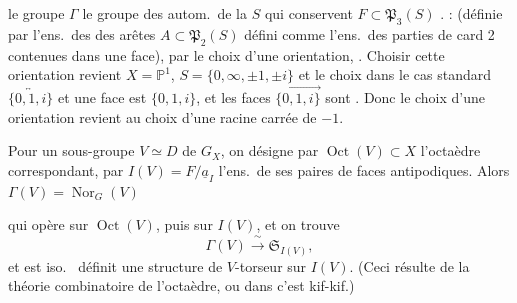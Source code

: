\documentclass[11pt,a4paper]{article}
\begin{document}
\ill{} le groupe $\Gamma$   le groupe des autom.\ de
la  \struck{\ill{}} $S$ qui conservent
\struck{\ill{}}  $F \subset \mathfrak{P}_{3}(S)$ \ill{}.
 : (définie par l'ens.\ des \ill{}
des arêtes $A \subset \mathfrak{P}_{2}(S)$  défini comme l'ens.\ des
parties de card 2 contenues dans une face), par le choix 
d'une orientation, \ill{}. Choisir cette orientation revient \ill{}
\ill{} $X = \mathbb{P}^{1}$, $S = \{0, \infty, \pm 1, \pm i\}$ et le choix
dans le cas standard \ill{}  $\overleftrightarrow{\{0,1,i\}}$
et \ill{} une face est $\{0, 1, i\}$, et les faces
$\overrightarrow{\{0,1,i\}}$ sont . Donc le choix d'une
orientation revient au choix d'une racine carrée de $-1$.

Pour un sous-groupe $V \simeq D$ de $G_{X}$, on désigne par
$\operatorname{Oct}(V) \subset X$ l'octaèdre correspondant, par
$I(V) = F/\underline{a}_{I}$ l'ens.\ de ses paires de faces antipodiques. Alors
$\Gamma(V) = \operatorname{Nor}_{G}(V)$

qui opère sur $\operatorname{Oct}(V)$, puis sur $I(V)$, et on trouve
\[
  \Gamma(V) \xrightarrow{\ \sim\ } \mathfrak{S}_{I(V)} ,
\]
et est iso.\ \struck{\ill{}} définit une structure de $V$-torseur sur $I(V)$.
(Ceci résulte de la théorie combinatoire de l'octaèdre, ou dans \ill{} c'est
kif-kif.)
\end{document}
